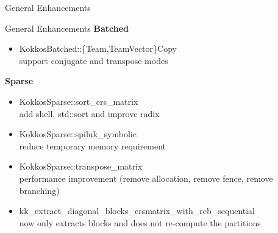 \begin{frame}[fragile]

  {\Huge General Enhancements}

  \vspace{10pt}

\end{frame}

\begin{frame}[fragile]{General Enhancements}
  \textbf{Batched}
  \begin{itemize}
  \item {\ttfamily KokkosBatched::\{Team,TeamVector\}Copy}\\
    \hspace{1em} support conjugate and transpose modes
  \end{itemize}

  \textbf{Sparse}
  \begin{itemize}
  \item {\ttfamily KokkosSparse::sort\_crs\_matrix}\\
    \hspace{1em} add shell, std::sort and improve radix
  \item {\ttfamily KokkosSparse::spiluk\_symbolic}\\
    \hspace{1em} reduce temporary memory requirement
  \item {\ttfamily KokkosSparse::transpose\_matrix}\\
    \hspace{1em} performance improvement (remove allocation, remove fence, remove branching)
  \item {\ttfamily kk\_extract\_diagonal\_blocks\_crsmatrix\_with\_rcb\_sequential}\\
    \hspace{1em} now only extracts blocks and does not re-compute the partitions
  \end{itemize}
  
\end{frame}




